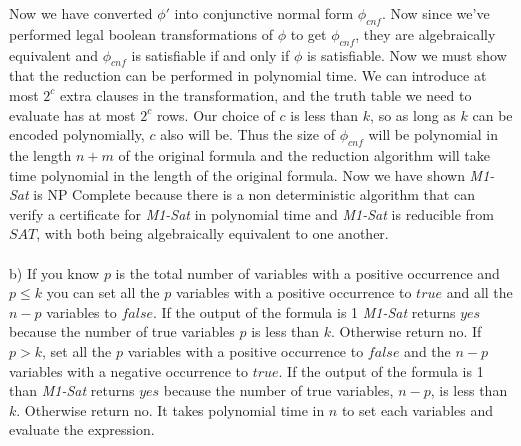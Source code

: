 \documentclass{article}
\begin{document}
Now we have converted $\phi'$ into conjunctive normal form $\phi_{cnf}$. Now since we've performed legal boolean transformations of $\phi$ to get $\phi_{cnf}$, they are algebraically equivalent and $\phi_{cnf}$ is satisfiable if and only if $\phi$ is satisfiable. Now we must show that the reduction can be performed in polynomial time. We can introduce at most $2^c$ extra clauses in the transformation, and the truth table we need to evaluate has at most $2^c$ rows. Our choice of $c$ is less than $k$, so as long as $k$ can be encoded polynomially, $c$ also will be.  Thus the size of $\phi_{cnf}$ will be polynomial in the length $n+m$ of the original formula and the reduction algorithm will take time polynomial in the length of the original formula. Now we have shown \textit{M1-Sat} is NP Complete because there is a non deterministic algorithm that can verify a certificate for \textit{M1-Sat} in polynomial time and \textit{M1-Sat} is reducible from $SAT$, with both being algebraically equivalent to one another.\\\\
b) If you know $p$ is the total number of variables with a positive occurrence and $p \leq k$ you can set all the $p$ variables with a positive occurrence to $true$ and all the $n-p$ variables to $false$.  If the output of the formula is 1 \textit{M1-Sat} returns $yes$ because the number of true variables $p$ is less than $k$.  Otherwise return no.  If $p > k$, set all the $p$ variables with a positive occurrence to $false$ and the $n - p$ variables with a negative occurrence to $true$.  If the output of the formula is 1 than \textit{M1-Sat} returns $yes$ because the number of true variables, $n - p$, is less than $k$. Otherwise return no.  It takes polynomial time in $n$ to set each variables and evaluate the expression.\\\\
\end{document}
